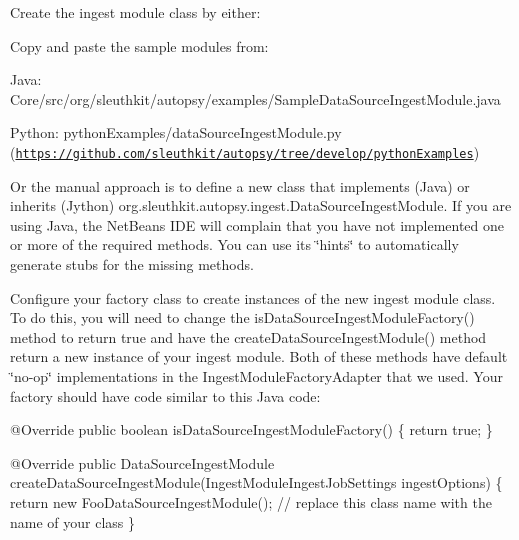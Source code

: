 \begin{DoxyEnumerate}
\item Create the ingest module class by either\+:
\begin{DoxyItemize}
\item Copy and paste the sample modules from\+:
\begin{DoxyItemize}
\item Java\+: Core/src/org/sleuthkit/autopsy/examples/\+Sample\+Data\+Source\+Ingest\+Module.\+java
\item Python\+: python\+Examples/data\+Source\+Ingest\+Module.\+py (\href{https://github.com/sleuthkit/autopsy/tree/develop/pythonExamples}{\tt https\+://github.\+com/sleuthkit/autopsy/tree/develop/python\+Examples})
\end{DoxyItemize}
\item Or the manual approach is to define a new class that implements (Java) or inherits (Jython) org.\+sleuthkit.\+autopsy.\+ingest.\+Data\+Source\+Ingest\+Module. If you are using Java, the Net\+Beans I\+DE will complain that you have not implemented one or more of the required methods. You can use its \char`\"{}hints\char`\"{} to automatically generate stubs for the missing methods.
\end{DoxyItemize}
\item Configure your factory class to create instances of the new ingest module class. To do this, you will need to change the is\+Data\+Source\+Ingest\+Module\+Factory() method to return true and have the create\+Data\+Source\+Ingest\+Module() method return a new instance of your ingest module. Both of these methods have default \char`\"{}no-\/op\char`\"{} implementations in the Ingest\+Module\+Factory\+Adapter that we used. Your factory should have code similar to this Java code\+:
\end{DoxyEnumerate}


\begin{DoxyCode}
@Override
\textcolor{keyword}{public} \textcolor{keywordtype}{boolean} isDataSourceIngestModuleFactory() \{
    \textcolor{keywordflow}{return} \textcolor{keyword}{true};
\}

@Override
\textcolor{keyword}{public} DataSourceIngestModule createDataSourceIngestModule(IngestModuleIngestJobSettings ingestOptions) \{
    \textcolor{keywordflow}{return} \textcolor{keyword}{new} FooDataSourceIngestModule();  \textcolor{comment}{// replace this class name with the name of your class}
\}
\end{DoxyCode}

